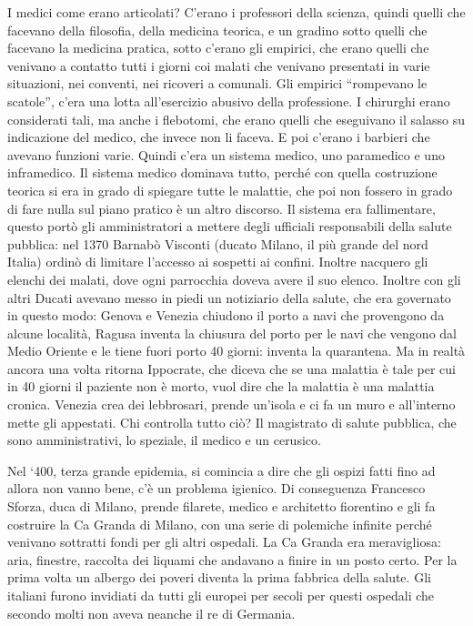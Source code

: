 I medici come erano articolati? C'erano i professori della scienza,
quindi quelli che facevano della filosofia, della medicina teorica, e un
gradino sotto quelli che facevano la medicina pratica, sotto c'erano gli
empirici, che erano quelli che venivano a contatto tutti i giorni coi
malati che venivano presentati in varie situazioni, nei conventi, nei
ricoveri a comunali. Gli empirici ``rompevano le scatole'', c'era una
lotta all'esercizio abusivo della professione. I chirurghi erano
considerati tali, ma anche i flebotomi, che erano quelli che eseguivano
il salasso su indicazione del medico, che invece non li faceva. E poi
c'erano i barbieri che avevano funzioni varie. Quindi c'era un sistema
medico, uno paramedico e uno inframedico. Il sistema medico dominava
tutto, perché con quella costruzione teorica si era in grado di spiegare
tutte le malattie, che poi non fossero in grado di fare nulla sul piano
pratico è un altro discorso. Il sistema era fallimentare, questo portò
gli amministratori a mettere degli ufficiali responsabili della salute
pubblica: nel 1370 Barnabò Visconti (ducato Milano, il più grande del
nord Italia) ordinò di limitare l'accesso ai sospetti ai confini.
Inoltre nacquero gli elenchi dei malati, dove ogni parrocchia doveva
avere il suo elenco. Inoltre con gli altri Ducati avevano messo in piedi
un notiziario della salute, che era governato in questo modo: Genova e
Venezia chiudono il porto a navi che provengono da alcune località,
Ragusa inventa la chiusura del porto per le navi che vengono dal Medio
Oriente e le tiene fuori porto 40 giorni: inventa la quarantena. Ma in
realtà ancora una volta ritorna Ippocrate, che diceva che se una
malattia è tale per cui in 40 giorni il paziente non è morto, vuol dire
che la malattia è una malattia cronica. Venezia crea dei lebbrosari,
prende un'isola e ci fa un muro e all'interno mette gli appestati. Chi
controlla tutto ciò? Il magistrato di salute pubblica, che sono
amministrativi, lo speziale, il medico e un cerusico.

Nel `400, terza grande epidemia, si comincia a dire che gli ospizi fatti
fino ad allora non vanno bene, c'è un problema igienico. Di conseguenza
Francesco Sforza, duca di Milano, prende filarete, medico e architetto
fiorentino e gli fa costruire la Ca Granda di Milano, con una serie di
polemiche infinite perché venivano sottratti fondi per gli altri
ospedali. La Ca Granda era meravigliosa: aria, finestre, raccolta dei
liquami che andavano a finire in un posto certo. Per la prima volta un
albergo dei poveri diventa la prima fabbrica della salute. Gli italiani
furono invidiati da tutti gli europei per secoli per questi ospedali che
secondo molti non aveva neanche il re di Germania.

